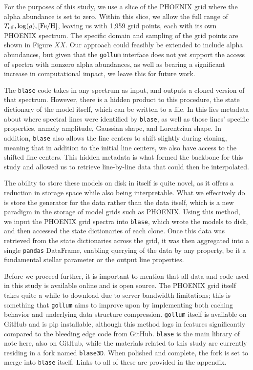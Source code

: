 \documentclass[twocolumn]{aastex631}
\def\Teff{T_{\rm eff}}
\def\logg{\log(g)}
\def\Z{\mathrm{[Fe/H]}}
\begin{document}
For the purposes of this study, we use a slice of the PHOENIX grid where the alpha abundance
is set to zero. Within this slice, we allow the full range of $\Teff, \logg, \Z$, leaving us with 1,959
grid points, each with its own PHOENIX spectrum. The specific domain and
sampling of the grid points are shown in Figure $XX$. Our approach could feasibly be extended to
include alpha abundances, but given that the \texttt{gollum} interface does not yet support the access
of spectra with nonzero alpha abundances, as well as bearing a significant increase in computational
impact, we leave this for future work.

The \texttt{blase} code takes in any spectrum as input, and outputs a cloned
version of that spectrum. However, there is a hidden product to this
procedure, the state dictionary of the model itself, which can be written to a file. In this lies metadata about
where spectral lines were identified by \texttt{blase}, as well as those lines'
specific properties, namely amplitude, Gaussian shape, and Lorentzian shape.
In addition, \texttt{blase} also allows the line centers to shift slightly during
cloning, meaning that in addition to the initial line centers, we
also have access to the shifted line centers. This hidden metadata is what
formed the backbone for this study and allowed us to retrieve line-by-line data
that could then be interpolated. 

The ability to store these models on disk in itself is quite novel, as it offers a reduction
in storage space while also being interpretable. What we effectively do is store the
generator for the data rather than the data itself, which is a new paradigm in the 
storage of model grids such as PHOENIX.
Using this method, we input the PHOENIX grid spectra into \texttt{blase},
which wrote the models to disk, and then accessed the state dictionaries of each clone. Once this data was retrieved from the state dictionaries
across the grid, it was then aggregated into a single \texttt{pandas} DataFrame, enabling
querying of the data by any property, be it a fundamental stellar parameter or the output
line properties.

Before we proceed further, it is important to mention that all data and code used in this study is available online and is open source. The PHOENIX grid itself takes quite a while to download
due to server bandwidth limitations; this is something that \texttt{gollum} aims to
improve upon by implementing both caching behavior and underlying data structure compression.
\texttt{gollum} itself is available on GitHub and is pip installable, although this
method lags in features significantly compared to the bleeding edge code from GitHub.
\texttt{blase} is the main library of note here, also on GitHub, while the
materials related to this study are currently residing in a fork named \texttt{blase3D}. When polished and complete,
the fork is set to merge into \texttt{blase} itself. Links to all of these are provided in the appendix.
\end{document}
